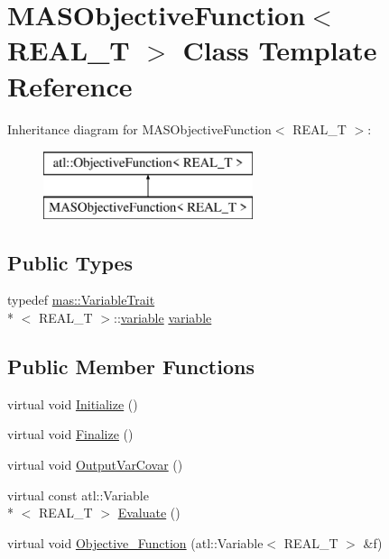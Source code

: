 \hypertarget{class_m_a_s_objective_function}{\section{M\-A\-S\-Objective\-Function$<$ R\-E\-A\-L\-\_\-\-T $>$ Class Template Reference}
\label{class_m_a_s_objective_function}
}
Inheritance diagram for M\-A\-S\-Objective\-Function$<$ R\-E\-A\-L\-\_\-\-T $>$\-:\begin{figure}[H]
\begin{center}
\leavevmode
\includegraphics[height=2.000000cm]{class_m_a_s_objective_function}
\end{center}
\end{figure}
\subsection*{Public Types}
\begin{DoxyCompactItemize}
\item 
typedef \hyperlink{structmas_1_1_variable_trait}{mas\-::\-Variable\-Trait}\\*
$<$ R\-E\-A\-L\-\_\-\-T $>$\-::\hyperlink{class_m_a_s_objective_function_ab707ad68242cf26ada5f9fd8a0b077f8}{variable} \hyperlink{class_m_a_s_objective_function_ab707ad68242cf26ada5f9fd8a0b077f8}{variable}
\end{DoxyCompactItemize}
\subsection*{Public Member Functions}
\begin{DoxyCompactItemize}
\item 
virtual void \hyperlink{class_m_a_s_objective_function_a6c607be2d674fd2cb899d29a1c2892d3}{Initialize} ()
\item 
virtual void \hyperlink{class_m_a_s_objective_function_a17bdf39788f6f53b3b9b58e8c51735fd}{Finalize} ()
\item 
virtual void \hyperlink{class_m_a_s_objective_function_af3dc8db94367da71eaa2164ed8a7479b}{Output\-Var\-Covar} ()
\item 
virtual const atl\-::\-Variable\\*
$<$ R\-E\-A\-L\-\_\-\-T $>$ \hyperlink{class_m_a_s_objective_function_aa3bd6cce1fc71e640728f0c0a3876f99}{Evaluate} ()
\item 
virtual void \hyperlink{class_m_a_s_objective_function_ad1956703d67276fd3ddc9189d6e7f6f2}{Objective\-\_\-\-Function} (atl\-::\-Variable$<$ R\-E\-A\-L\-\_\-\-T $>$ \&f)
\end{DoxyCompactItemize}
